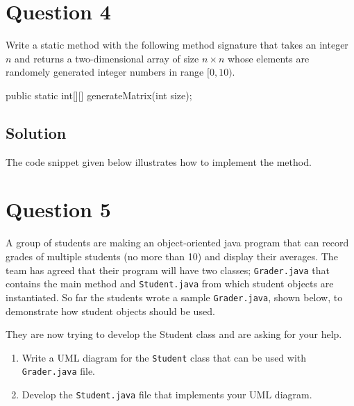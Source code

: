 \documentclass[12pt,letterpaper,twoside]{article}
\begin{document}


\newpage

\section*{Question 4}

Write a static method with the following method signature that takes an integer $n$ and returns a two-dimensional array of size $n \times n$ whose elements are randomely generated integer numbers in range $[0, 10)$.

\begin{terminal}
public static int[][] generateMatrix(int size);
\end{terminal}

\subsection*{Solution}

The code snippet given below illustrates how to implement the method.



\newpage

\section*{Question 5}

A group of students are making an object-oriented java program that can record grades of multiple students (no more than 10) and display their averages.
The team has agreed that their program will have two classes; \texttt{Grader.java} that contains the main method and \texttt{Student.java} from which student objects are instantiated.
So far the students wrote a sample \texttt{Grader.java}, shown below, to demonstrate how student objects should be used.



They are now trying to develop the Student class and are asking for your help.

\begin{enumerate}
	\item Write a UML diagram for the \texttt{Student} class that can be used with \texttt{Grader.java} file.
	\item Develop the \texttt{Student.java} file that implements your UML diagram.
\end{enumerate}
\end{document}
